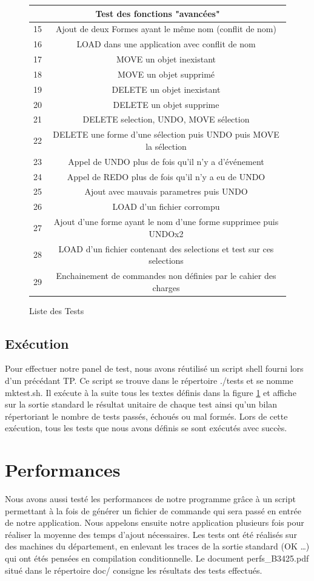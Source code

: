 \documentclass[12pt]{article}
\begin{document}
\begin{figure}[!h]
\begin{center}
\begin{tabular}{|c|c|}
\multicolumn{2}{|c|}{\textbf{\large{Test des fonctions "avancées"}}}\\
\hline
15 & Ajout de deux Formes ayant le même nom (conflit de nom)\\
\hline
16 & LOAD dans une application avec conflit de nom\\
\hline
17 & MOVE un objet inexistant\\
\hline
18 & MOVE un objet supprimé\\
\hline
19 & DELETE un objet inexistant\\
\hline
20 & DELETE un objet supprime\\
\hline
21 & DELETE selection, UNDO, MOVE sélection\\
\hline
22 & DELETE une forme d'une sélection puis UNDO puis MOVE la sélection\\
\hline
23 & Appel de UNDO plus de fois qu'il n'y a d'événement\\
\hline
24 & Appel de REDO plus de fois qu'il n'y a eu de UNDO\\
\hline
25 & Ajout avec mauvais parametres puis UNDO\\
\hline
26 & LOAD d'un fichier corrompu\\
\hline
27 & Ajout d'une forme ayant le nom d'une forme supprimee puis UNDOx2\\
\hline
28 & LOAD d'un fichier contenant des selections et test sur ces selections\\
\hline
29 & Enchainement de commandes non définies par le cahier des charges\\
\hline
\end{tabular}
\end{center}
\caption{Liste des Tests}
\label{tab:Liste des Tests}
\end{figure}
\subsection{Exécution}
Pour effectuer notre panel de test, nous avons réutilisé un script shell fourni lors d'un précédant TP. Ce script se trouve dans le répertoire ./tests et se nomme mktest.sh. Il exécute à la suite tous les textes définis dans la figure \ref{tab:Liste des Tests} et affiche sur la sortie standard le résultat unitaire de chaque test ainsi qu'un bilan répertoriant le nombre de tests passés, échoués ou mal formés. Lors de cette exécution, tous les tests que nous avons définis se sont exécutés avec succès. 

\section{Performances}
Nous avons aussi testé les performances de notre programme grâce à un script permettant à la fois de générer un fichier de commande qui sera passé en entrée de notre application. Nous appelons ensuite notre application plusieurs fois pour réaliser la moyenne des temps d'ajout nécessaires. Les tests ont été réalisés sur des machines du département, en enlevant les traces de la sortie standard (OK \ldots) qui ont étés pensées en compilation conditionnelle. Le document perfs\_B3425.pdf situé dans le répertoire doc/ consigne les résultats des tests effectués.
\end{document}
